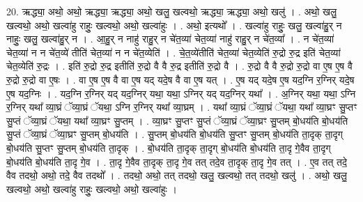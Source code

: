 \documentclass[17pt]{extarticle}
\begin{document}
20. ऋद्ध्या॒ अथो॒ अथो॒ ऋद्ध्या॒ ऋद्ध्या॒ अथो॒ खलु॒ खल्वथो॒ ऋद्ध्या॒ ऋद्ध्या॒ अथो॒ खलु॑ । . अथो॒ खलु॒ खल्वथो॒ अथो॒ खल्वा॑हु राहुः॒ खल्वथो॒ अथो॒ खल्वा॑हुः । . अथो॒ इत्यथो᳚ । . खल्वा॑हु राहुः॒ खलु॒ खल्वा॑हु॒र् न नाहुः॒ खलु॒ खल्वा॑हु॒र् न । . आ॒हु॒र् न नाहु॑ राहु॒र् न चे॑त॒व्या॑ चेत॒व्या॑ नाहु॑ राहु॒र् न चे॑त॒व्या᳚ । . न चे॑त॒व्या॑ चेत॒व्या॑ न न चे॑त॒व्ये॑ तीति॑ चेत॒व्या॑ न न चे॑त॒व्येति॑ । . चे॒त॒व्ये॑तीति॑ चेत॒व्या॑ चेत॒व्येति॑ रु॒द्रो रु॒द्र इति॑ चेत॒व्या॑ चेत॒व्येति॑ रु॒द्रः । . इति॑ रु॒द्रो रु॒द्र इतीति॑ रु॒द्रो वै वै रु॒द्र इतीति॑ रु॒द्रो वै । . रु॒द्रो वै वै रु॒द्रो रु॒द्रो वा ए॒ष ए॒ष वै रु॒द्रो रु॒द्रो वा ए॒षः । . वा ए॒ष ए॒ष वै वा ए॒ष यद् यदे॒ष वै वा ए॒ष यत् । . ए॒ष यद् यदे॒ष ए॒ष यद॒ग्नि र॒ग्निर् यदे॒ष ए॒ष यद॒ग्निः । . यद॒ग्नि र॒ग्निर् यद् यद॒ग्निर् यथा॒ यथा॒ ऽग्निर् यद् यद॒ग्निर् यथा᳚ । . अ॒ग्निर् यथा॒ यथा॒ ऽग्नि र॒ग्निर् यथा᳚ व्या॒घ्रं ॅव्या॒घ्रं ॅयथा॒ ऽग्नि र॒ग्निर् यथा᳚ व्या॒घ्रम् । . यथा᳚ व्या॒घ्रं ॅव्या॒घ्रं ॅयथा॒ यथा᳚ व्या॒घ्रꣳ सु॒प्तꣳ सु॒प्तं ॅव्या॒घ्रं ॅयथा॒ यथा᳚ व्या॒घ्रꣳ सु॒प्तम् । . व्या॒घ्रꣳ सु॒प्तꣳ सु॒प्तं ॅव्या॒घ्रं ॅव्या॒घ्रꣳ सु॒प्तम् बो॒धय॑ति बो॒धय॑ति सु॒प्तं ॅव्या॒घ्रं ॅव्या॒घ्रꣳ सु॒प्तम् बो॒धय॑ति । . सु॒प्तम् बो॒धय॑ति बो॒धय॑ति सु॒प्तꣳ सु॒प्तम् बो॒धय॑ति ता॒दृक् ता॒दृग् बो॒धय॑ति सु॒प्तꣳ सु॒प्तम् बो॒धय॑ति ता॒दृक् । . बो॒धय॑ति ता॒दृक् ता॒दृग् बो॒धय॑ति बो॒धय॑ति ता॒दृ गे॒वैव ता॒दृग् बो॒धय॑ति बो॒धय॑ति ता॒दृ गे॒व । . ता॒दृ गे॒वैव ता॒दृक् ता॒दृ गे॒व तत् तदे॒व ता॒दृक् ता॒दृ गे॒व तत् । . ए॒व तत् तदे॒ वैव तदथो॒ अथो॒ तदे॒ वैव तदथो᳚ । . तदथो॒ अथो॒ तत् तदथो॒ खलु॒ खल्वथो॒ तत् तदथो॒ खलु॑ । . अथो॒ खलु॒ खल्वथो॒ अथो॒ खल्वा॑हु राहुः॒ खल्वथो॒ अथो॒ खल्वा॑हुः । \newline
\end{document}
